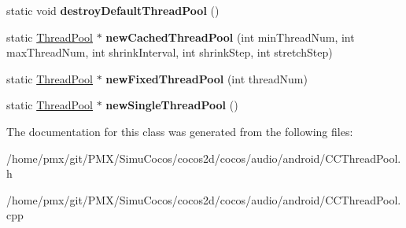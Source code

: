 \begin{DoxyCompactItemize}
static void {\bfseries destroy\+Default\+Thread\+Pool} ()
\item 
\mbox{\label{classcocos2d_1_1experimental_1_1ThreadPool_ac9cb2165a86e2dd423f66758f5bd5b51}} 
static \hyperlink{classcocos2d_1_1experimental_1_1ThreadPool}{Thread\+Pool} $\ast$ {\bfseries new\+Cached\+Thread\+Pool} (int min\+Thread\+Num, int max\+Thread\+Num, int shrink\+Interval, int shrink\+Step, int stretch\+Step)
\item 
\mbox{\label{classcocos2d_1_1experimental_1_1ThreadPool_ac0d5f61018dc18a9ec7136f8399bf5ae}} 
static \hyperlink{classcocos2d_1_1experimental_1_1ThreadPool}{Thread\+Pool} $\ast$ {\bfseries new\+Fixed\+Thread\+Pool} (int thread\+Num)
\item 
\mbox{\label{classcocos2d_1_1experimental_1_1ThreadPool_a0157686294e7ee65608a0268a31820a0}} 
static \hyperlink{classcocos2d_1_1experimental_1_1ThreadPool}{Thread\+Pool} $\ast$ {\bfseries new\+Single\+Thread\+Pool} ()
\end{DoxyCompactItemize}


The documentation for this class was generated from the following files\+:\begin{DoxyCompactItemize}
\item 
/home/pmx/git/\+P\+M\+X/\+Simu\+Cocos/cocos2d/cocos/audio/android/C\+C\+Thread\+Pool.\+h\item 
/home/pmx/git/\+P\+M\+X/\+Simu\+Cocos/cocos2d/cocos/audio/android/C\+C\+Thread\+Pool.\+cpp\end{DoxyCompactItemize}
